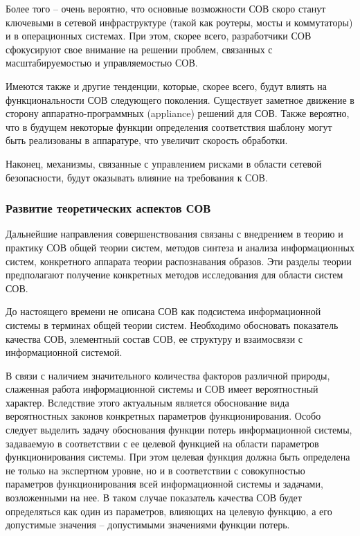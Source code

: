 Более того – очень вероятно, что основные возможности СОВ скоро станут ключевыми в
сетевой инфраструктуре (такой как роутеры, мосты и коммутаторы) и в операционных системах.
При этом, скорее всего, разработчики СОВ сфокусируют свое внимание на решении проблем,
связанных с масштабируемостью и управляемостью СОВ.

Имеются также и другие тенденции, которые, скорее всего, будут влиять на функциональности
СОВ следующего поколения. Существует заметное движение в сторону аппаратно-программных
(appliance) решений для СОВ. Также вероятно, что в будущем некоторые функции определения
соответствия шаблону могут быть реализованы в аппаратуре, что увеличит скорость обработки.

Наконец, механизмы, связанные с управлением рисками в области сетевой безопасности,
будут оказывать влияние на требования к СОВ.



\subsubsection{Развитие теоретических аспектов СОВ}

Дальнейшие направления совершенствования связаны с внедрением в теорию и практику СОВ
общей теории систем, методов синтеза и анализа информационных систем, конкретного аппарата
теории распознавания образов. Эти разделы теории предполагают получение конкретных методов
исследования для области систем СОВ.

До настоящего времени не описана СОВ как подсистема информационной системы в терминах
общей теории систем. Необходимо обосновать показатель качества СОВ, элементный состав
СОВ, ее структуру и взаимосвязи с информационной системой.

В связи с наличием значительного количества факторов различной природы, слаженная работа
информационной системы и СОВ имеет вероятностный характер. Вследствие этого актуальным
является обоснование вида вероятностных законов конкретных параметров функционирования.
Особо следует выделить задачу обоснования функции потерь информационной системы, задаваемую
в соответствии с ее целевой функцией на области параметров функционирования системы.
При этом целевая функция должна быть определена не только на экспертном уровне, но и в
соответствии с совокупностью параметров функционирования всей информационной системы и
задачами, возложенными на нее. В таком случае показатель качества СОВ будет определяться
как один из параметров, влияющих на целевую функцию, а его допустимые значения --
допустимыми значениями функции потерь.

